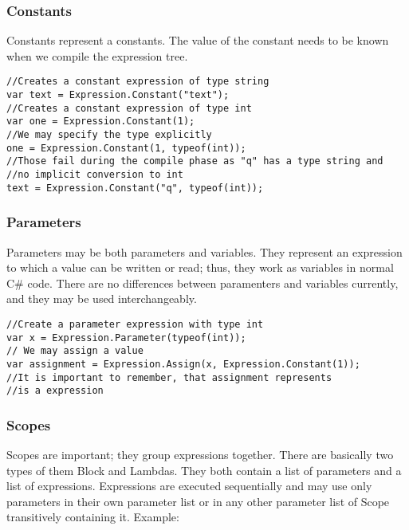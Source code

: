 \subsubsection{Constants}
Constants represent a constants. The value of the constant needs to be known when we compile the expression tree.
\begin{lstlisting}
//Creates a constant expression of type string
var text = Expression.Constant("text");
//Creates a constant expression of type int
var one = Expression.Constant(1);
//We may specify the type explicitly
one = Expression.Constant(1, typeof(int));
//Those fail during the compile phase as "q" has a type string and
//no implicit conversion to int
text = Expression.Constant("q", typeof(int));
\end{lstlisting}

\subsubsection{Parameters}
Parameters may be both parameters and variables. They represent an expression to which a value can be written or read; thus, they work as variables in normal C\# code. There are no differences between paramenters and variables currently, and they may be used interchangeably. 
\begin{lstlisting}
//Create a parameter expression with type int
var x = Expression.Parameter(typeof(int));
// We may assign a value
var assignment = Expression.Assign(x, Expression.Constant(1));
//It is important to remember, that assignment represents
//is a expression
\end{lstlisting}

\subsubsection{Scopes}
Scopes are important; they group expressions together. There are basically two types of them Block and Lambdas. They both contain a list of parameters and a list of expressions. Expressions are executed sequentially and may use only parameters in their own parameter list or in any other parameter list of Scope transitively containing it. Example:

